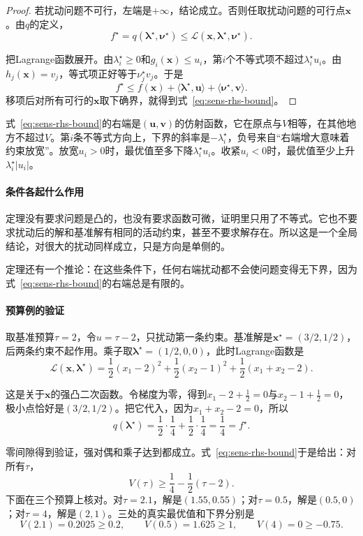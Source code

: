 \begin{proof}
若扰动问题不可行，左端是$+\infty$，结论成立。否则任取扰动问题的可行点$\bm{x}$。由$q$的定义，
\[
 f^\star=q(\bm{\lambda}^\star,\bm{\nu}^\star)\leq\mathcal{L}(\bm{x},\bm{\lambda}^\star,\bm{\nu}^\star).
\]

把Lagrange函数展开。由$\lambda_i^\star\geq0$和$g_i(\bm{x})\leq u_i$，第$i$个不等式项不超过$\lambda_i^\star u_i$。由$h_j(\bm{x})=v_j$，等式项正好等于$\nu_j^\star v_j$。于是
\[
 f^\star\leq f(\bm{x})+\langle\bm{\lambda}^\star,\bm{u}\rangle+\langle\bm{\nu}^\star,\bm{v}\rangle.
\]
移项后对所有可行的$\bm{x}$取下确界，就得到式~\eqref{eq:sens-rhs-bound}。
\end{proof}

式~\eqref{eq:sens-rhs-bound}的右端是$(\bm{u},\bm{v})$的仿射函数，它在原点与$V$相等，在其他地方不超过$V$。第$i$条不等式方向上，下界的斜率是$-\lambda_i^\star$，负号来自“右端增大意味着约束放宽”。放宽$u_i>0$时，最优值至多下降$\lambda_i^\star u_i$。收紧$u_i<0$时，最优值至少上升$\lambda_i^\star\lvert u_i\rvert$。

\paragraph{条件各起什么作用}
定理没有要求问题是凸的，也没有要求函数可微，证明里只用了不等式。它也不要求扰动后的解和基准解有相同的活动约束，甚至不要求解存在。所以这是一个全局结论，对很大的扰动同样成立，只是方向是单侧的。

定理还有一个推论：在这些条件下，任何右端扰动都不会使问题变得无下界，因为式~\eqref{eq:sens-rhs-bound}的右端总是有限的。

\paragraph{预算例的验证}
取基准预算$\tau=2$，令$u=\tau-2$，只扰动第一条约束。基准解是$\bm{x}^\star=(3/2,1/2)$，后两条约束不起作用。乘子取$\bm{\lambda}^\star=(1/2,0,0)$，此时Lagrange函数是
\[
 \mathcal{L}(\bm{x},\bm{\lambda}^\star)=\frac12(x_1-2)^2+\frac12(x_2-1)^2+\frac12(x_1+x_2-2).
\]

这是关于$\bm{x}$的强凸二次函数。令梯度为零，得到$x_1-2+\tfrac12=0$与$x_2-1+\tfrac12=0$，极小点恰好是$(3/2,1/2)$。把它代入，因为$x_1+x_2-2=0$，所以
\[
 q(\bm{\lambda}^\star)=\frac12\cdot\frac14+\frac12\cdot\frac14=\frac14=f^\star.
\]

零间隙得到验证，强对偶和乘子达到都成立。式~\eqref{eq:sens-rhs-bound}于是给出：对所有$\tau$，
\begin{equation}
 V(\tau)\geq\frac14-\frac12(\tau-2).
 \label{eq:sens-budget-bound}
\end{equation}
下面在三个预算上核对。对$\tau=2.1$，解是$(1.55,0.55)$；对$\tau=0.5$，解是$(0.5,0)$；对$\tau=4$，解是$(2,1)$。三处的真实最优值和下界分别是
\[
 V(2.1)=0.2025\geq0.2,\qquad
 V(0.5)=1.625\geq1,\qquad
 V(4)=0\geq-0.75.
\]

